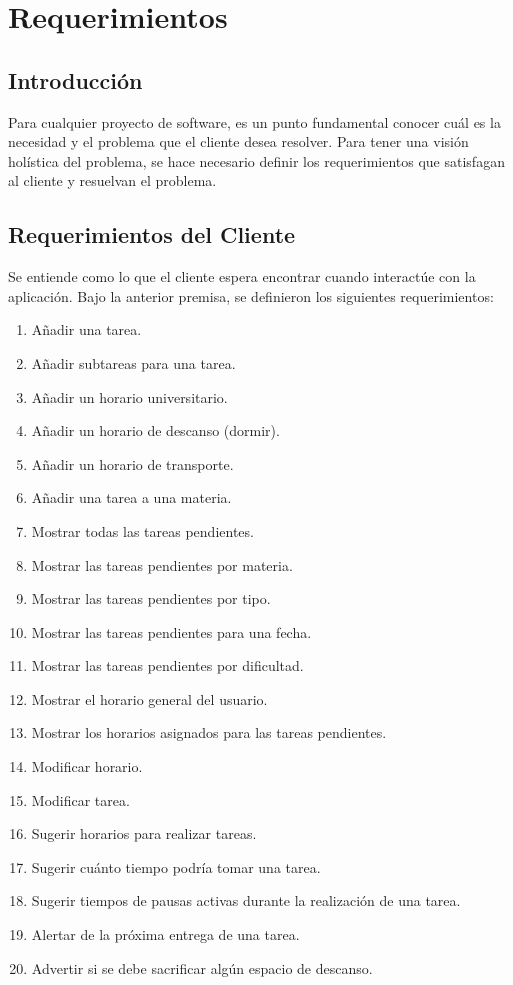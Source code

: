 
\chapter{Requerimientos}
\section{Introducción}
Para cualquier proyecto de software, es un punto fundamental conocer cuál es la necesidad y el problema que el cliente desea resolver. Para tener una visión holística del problema, se hace necesario definir los requerimientos que satisfagan al cliente y resuelvan el problema.

\section{Requerimientos del Cliente}
Se entiende como lo que el cliente espera encontrar cuando interactúe con la aplicación. Bajo la anterior premisa, se definieron los siguientes requerimientos:
\begin{enumerate}
	\item Añadir una tarea.
	\item Añadir subtareas para una tarea.
	\item Añadir un horario universitario.
	\item Añadir un horario de descanso (dormir).
	\item Añadir un horario de transporte.
	\item Añadir una tarea a una materia.
	\item Mostrar todas las tareas pendientes.
	\item Mostrar las tareas pendientes por materia.
	\item Mostrar las tareas pendientes por tipo.
	\item Mostrar las tareas pendientes para una fecha.
	\item Mostrar las tareas pendientes por dificultad.
	\item Mostrar el horario general del usuario.
	\item Mostrar los horarios asignados para las tareas pendientes.
	\item Modificar horario.
	\item Modificar tarea.
	\item Sugerir horarios para realizar tareas.
	\item Sugerir cuánto tiempo podría tomar una tarea.
	\item Sugerir tiempos de pausas activas durante la realización de una tarea.
	\item Alertar de la próxima entrega de una tarea.
	\item Advertir si se debe sacrificar algún espacio de descanso.

\end{enumerate}

